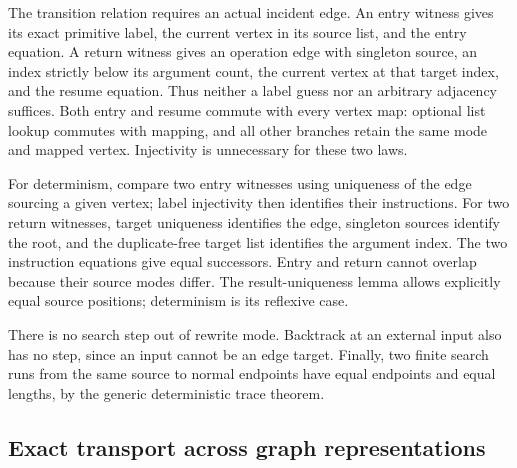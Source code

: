 

The transition relation requires an actual incident edge. An entry witness
gives its exact primitive label, the current vertex in its source list, and
the entry equation. A return witness gives an operation edge with singleton
source, an index strictly below its argument count, the current vertex at
that target index, and the resume equation. Thus neither a label guess nor an
arbitrary adjacency suffices. Both entry and resume commute with every vertex
map: optional list lookup commutes with mapping, and all other branches retain
the same mode and mapped vertex. Injectivity is unnecessary for these two laws.




For determinism, compare two entry witnesses using uniqueness of the edge
sourcing a given vertex; label injectivity then identifies their instructions.
For two return witnesses, target uniqueness identifies the edge, singleton
sources identify the root, and the duplicate-free target list identifies the
argument index. The two instruction equations give equal successors. Entry
and return cannot overlap because their source modes differ. The result-uniqueness
lemma allows explicitly equal source positions; determinism is its reflexive case.

There is no search step out of rewrite mode. Backtrack at an external input
also has no step, since an input cannot be an edge target. Finally, two finite
search runs from the same source to normal endpoints have equal endpoints and
equal lengths, by the generic deterministic trace theorem.






\subsection{Exact transport across graph representations}

